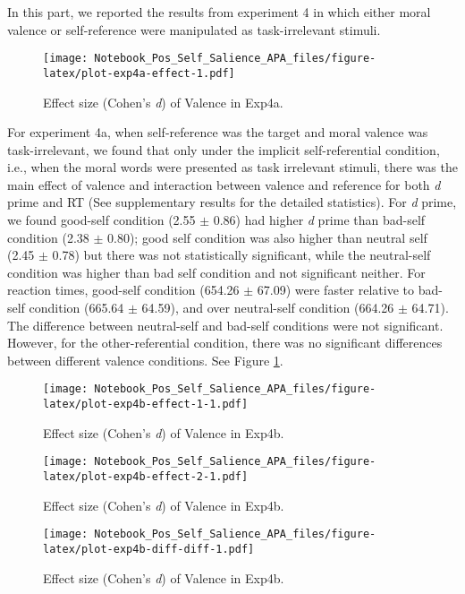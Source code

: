 \documentclass[
  english,
  man]{apa6}
\begin{document}
In this part, we reported the results from experiment 4 in which either moral valence or self-reference were manipulated as task-irrelevant stimuli.

\begin{figure}
\centering
\texttt{[image: Notebook\_Pos\_Self\_Salience\_APA\_files/figure-latex/plot-exp4a-effect-1.pdf]}
\caption{\label{fig:plot-exp4a-effect}Effect size (Cohen's \emph{d}) of Valence in Exp4a.}
\end{figure}

For experiment 4a, when self-reference was the target and moral valence was task-irrelevant, we found that only under the implicit self-referential condition, i.e., when the moral words were presented as task irrelevant stimuli, there was the main effect of valence and interaction between valence and reference for both \emph{d} prime and RT (See supplementary results for the detailed statistics). For \emph{d} prime, we found good-self condition (2.55 \(\pm\) 0.86) had higher \emph{d} prime than bad-self condition (2.38 \(\pm\) 0.80); good self condition was also higher than neutral self (2.45 \(\pm\) 0.78) but there was not statistically significant, while the neutral-self condition was higher than bad self condition and not significant neither. For reaction times, good-self condition (654.26 \(\pm\) 67.09) were faster relative to bad-self condition (665.64 \(\pm\) 64.59), and over neutral-self condition (664.26 \(\pm\) 64.71). The difference between neutral-self and bad-self conditions were not significant. However, for the other-referential condition, there was no significant differences between different valence conditions. See Figure \ref{fig:plot-exp4a-effect}.

\begin{figure}
\centering
\texttt{[image: Notebook\_Pos\_Self\_Salience\_APA\_files/figure-latex/plot-exp4b-effect-1-1.pdf]}
\caption{\label{fig:plot-exp4b-effect-1}Effect size (Cohen's \emph{d}) of Valence in Exp4b.}
\end{figure}

\begin{figure}
\centering
\texttt{[image: Notebook\_Pos\_Self\_Salience\_APA\_files/figure-latex/plot-exp4b-effect-2-1.pdf]}
\caption{\label{fig:plot-exp4b-effect-2}Effect size (Cohen's \emph{d}) of Valence in Exp4b.}
\end{figure}

\begin{figure}
\centering
\texttt{[image: Notebook\_Pos\_Self\_Salience\_APA\_files/figure-latex/plot-exp4b-diff-diff-1.pdf]}
\caption{\label{fig:plot-exp4b-diff-diff}Effect size (Cohen's \emph{d}) of Valence in Exp4b.}
\end{figure}
\end{document}
